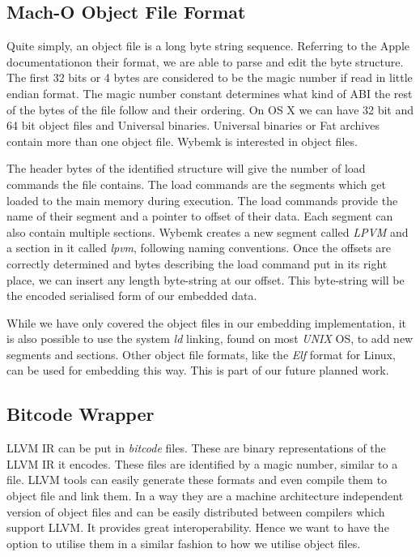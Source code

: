 \subsection{Mach-O Object File Format}

Quite simply, an object file is a long byte string sequence. Referring to the
Apple documentation\footnotemark on their format, we are able to parse and
edit the \macho byte structure. The first 32 bits or 4 bytes are considered to
be the magic number if read in little endian format. The magic number constant
determines what kind of ABI the rest of the bytes of the file follow and their
ordering. On OS X we can have 32 bit and 64 bit \macho object files and
Universal binaries. Universal binaries or Fat archives contain more than one
object file. Wybemk is interested in \macho object files.


The header bytes of the identified structure will give the number of load
commands the file contains. The load commands are the segments which get loaded
to the main memory during execution. The load commands provide the name of
their segment and a pointer to offset of their data. Each segment can also
contain multiple sections. Wybemk creates a new segment called
\textit{\textunderscore \textunderscore LPVM} and a section in it called
\textit{\textunderscore \textunderscore lpvm}, following naming
conventions. Once the offsets are correctly determined and bytes describing the
load command put in its right place, we can insert any length byte-string at
our offset. This byte-string will be the encoded serialised form of our
embedded data.

While we have only covered the \macho object files in our embedding
implementation, it is also possible to use the system \textit{ld} linking,
found on most \textit{UNIX} OS, to add new segments and sections. Other object
file formats, like the \textit{Elf} format for Linux, can be used for embedding
this way. This is part of our future planned work.


\subsection{Bitcode Wrapper}

LLVM IR can be put in \textit{bitcode} files\footnotemark. These are binary
representations of the LLVM IR it encodes. These files are identified by a
magic number, similar to a \macho file. LLVM tools can easily generate these
formats and even compile them to object file and link them. In a way they are a
machine architecture independent version of object files and can be easily
distributed between compilers which support LLVM. It provides great
interoperability. Hence we want to have the option to utilise them in a similar
fashion to how we utilise object files.

